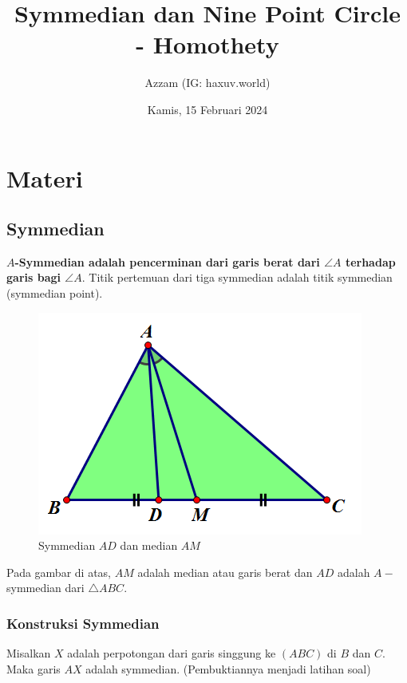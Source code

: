 \documentclass[11pt]{scrartcl}
\title{Symmedian dan Nine Point Circle - Homothety}
\author{Azzam (IG: haxuv.world)}
\date{Kamis, 15 Februari 2024}
\begin{document}
\maketitle
\renewcommand*\contentsname{Daftar Isi}
\tableofcontents
\newpage

\section{Materi}
\subsection{Symmedian}
\textbf{$A$-Symmedian adalah pencerminan dari garis berat dari $\angle A$ terhadap garis bagi $\angle A$}. Titik pertemuan dari tiga symmedian adalah titik symmedian (symmedian point).
\begin{figure}[h]
    \centering
    \includegraphics[scale=0.5]{Geometri/Symmedian-NinePoint/symmedian.png}
    \caption{Symmedian $AD$ dan median $AM$}
    \label{fig:symmedian}
\end{figure}
Pada gambar di atas, $AM$ adalah median atau garis berat dan $AD$ adalah $A-$symmedian dari $\triangle ABC$.

\subsubsection{Konstruksi Symmedian}
Misalkan $X$ adalah perpotongan dari garis singgung ke $ (ABC) $ di $ B $ dan $ C $. Maka garis $ AX $ adalah symmedian. (Pembuktiannya menjadi latihan soal)
\end{document}
